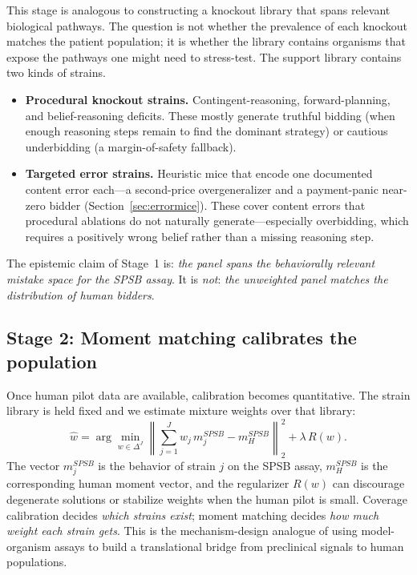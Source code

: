 \documentclass[12pt]{article}
\newcommand{\SPSB}{SPSB}
\begin{document}
This stage is analogous to constructing a knockout library that spans
relevant biological pathways. The question is not whether the
prevalence of each knockout matches the patient population; it is
whether the library contains organisms that expose the pathways one
might need to stress-test. The support library contains two kinds of
strains.
\begin{itemize}
\item \textbf{Procedural knockout strains.} Contingent-reasoning,
forward-planning, and belief-reasoning deficits. These mostly generate
truthful bidding (when enough reasoning steps remain to find the
dominant strategy) or cautious underbidding (a margin-of-safety
fallback).
\item \textbf{Targeted error strains.} Heuristic mice that encode one
documented content error each---a second-price overgeneralizer and a
payment-panic near-zero bidder (Section~\ref{sec:errormice}). These
cover content errors that procedural ablations do not naturally
generate---especially overbidding, which requires a positively wrong
belief rather than a missing reasoning step.
\end{itemize}
The epistemic claim of Stage~1 is: \emph{the panel spans the
behaviorally relevant mistake space for the \SPSB{} assay}. It is
\emph{not}: \emph{the unweighted panel matches the distribution of
human bidders}.

\subsection{Stage 2: Moment matching calibrates the population}

Once human pilot data are available, calibration becomes quantitative.
The strain library is held fixed and we estimate mixture weights over
that library:
\begin{equation}
\widehat{w}
=
\arg\min_{w \in \Delta^J}
\left\|
\sum_{j=1}^{J} w_j\, m_j^{\SPSB}
- m_H^{\SPSB}
\right\|_2^2
+ \lambda\, R(w).
\label{eq:momentmatch}
\end{equation}
The vector $m_j^{\SPSB}$ is the behavior of strain $j$ on the \SPSB{}
assay, $m_H^{\SPSB}$ is the corresponding human moment vector, and the
regularizer $R(w)$ can discourage degenerate solutions or stabilize
weights when the human pilot is small. Coverage calibration decides
\emph{which strains exist}; moment matching decides \emph{how much
weight each strain gets}. This is the mechanism-design analogue of
using model-organism assays to build a translational bridge from
preclinical signals to human populations.
\end{document}
